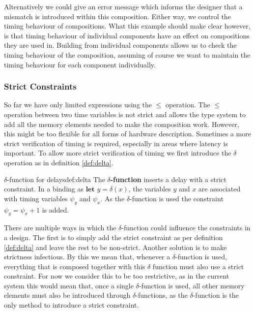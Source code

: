 Alternatively we could give an error message which informs the designer that a mismatch is introduced within this composition.
Either way, we control the timing behaviour of compositions.
What this example should make clear however, is that timing behaviour of individual components have an effect on compositions they are used in.
Building from individual components allows us to check the timing behaviour of the composition, assuming of course we want to maintain the timing behaviour for each component individually.




\subsubsection{Strict Constraints}
So far we have only limited expressions using the $\le$ operation.
The $\le$ operation between two time variables is not strict and allows the type system to add all the memory elements needed to make the composition work.
However, this might be too flexible for all forms of hardware description.
Sometimes a more strict verification of timing is required, especially in areas where latency is important.
To allow more strict verification of timing we first introduce the $\delta$ operation as in definition \ref{def:delta}.

\begin{definitiontitled}{$\delta$-function for delays}{def:delta}
The $\delta$\textbf{-function} inserts a delay with a strict constraint.
In a binding as $\textbf{let } y = \delta(x)$, the variables $y$ and $x$ are associated with timing variables $\psi_y$ and $\psi_x$. 
As the $\delta$-function is used the constraint $\psi_y = \psi_x + 1$ is added.
\end{definitiontitled}

There are multiple ways in which the $\delta$-function could influence the constraints in a design.
The first is to simply add the strict constraint as per definition \ref{def:delta} and leave the rest to be non-strict.
Another solution is to make strictness infectious. 
By this we mean that, whenever a $\delta$-function is used, everything that is composed together with this $\delta$ function must also use a strict constraint.
For now we consider this to be too restrictive, as in the current system this would mean that, once a single $\delta$-function is used, all other memory elements must also be introduced through $\delta$-functions, as the $\delta$-function is the only method to introduce a strict constraint.

